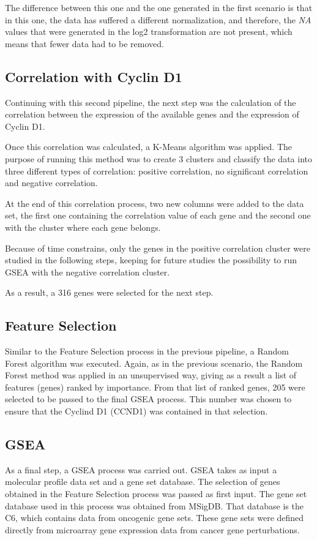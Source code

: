 The difference between this one and the one generated in the first scenario is that in this one, the data has suffered a different normalization, and therefore, the \textit{NA} values that were generated in the log2 transformation are not present, which means that fewer data had to be removed.

\subsection{Correlation with Cyclin D1}
Continuing with this second pipeline, the next step was the calculation of the correlation between the expression of the available genes and the expression of Cyclin D1.

Once this correlation was calculated, a K-Means algorithm was applied.
The purpose of running this method was to create 3 clusters and classify the data into three different types of correlation: positive correlation, no significant correlation and negative correlation.

At the end of this correlation process, two new columns were added to the data set, the first one containing the correlation value of each gene and the second one with the cluster where each gene belongs.

Because of time constrains, only the genes in the positive correlation cluster were studied in the following steps, keeping for future studies the possibility to run GSEA with the negative correlation cluster.

As a result, a 316 genes were selected for the next step.

\subsection{Feature Selection}
Similar to the Feature Selection process in the previous pipeline, a Random Forest algorithm was executed. Again, as in the previous scenario, the Random Forest method was applied in an unsupervised way, giving as a result a list of features (genes) ranked by importance.
From that list of ranked genes, 205 were selected to be passed to the final GSEA process. This number was chosen to ensure that the Cyclind D1 (CCND1) was contained in that selection.

\subsection{GSEA}

As a final step, a GSEA process was carried out.
GSEA takes as input a molecular profile data set and a gene set database.
The selection of genes obtained in the Feature Selection process was passed as first input. The gene set database used in this process was obtained from MSigDB. That database is the C6, which contains data from oncogenic gene sets. These gene sets were defined directly from microarray gene expression data from cancer gene perturbations.

